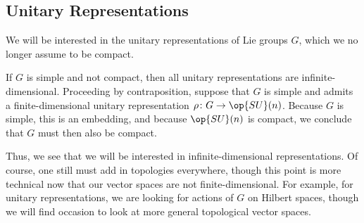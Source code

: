 \documentclass[../notes.tex]{subfiles}
\begin{document}
\subsection{Unitary Representations}
We will be interested in the unitary representations of Lie groups $G$, which we no longer assume to be compact.
\begin{remark}
	If $G$ is simple and not compact, then all unitary representations are infinite-dimensional. Proceeding by contraposition, suppose that $G$ is simple and admits a finite-dimensional unitary representation $\rho\colon G\to\op{SU}(n)$. Because $G$ is simple, this is an embedding, and because $\op{SU}(n)$ is compact, we conclude that $G$ must then also be compact.
\end{remark}
Thus, we see that we will be interested in infinite-dimensional representations. Of course, one still must add in topologies everywhere, though this point is more technical now that our vector spaces are not finite-dimensional. For example, for unitary representations, we are looking for actions of $G$ on Hilbert spaces, though we will find occasion to look at more general topological vector spaces.
\end{document}
